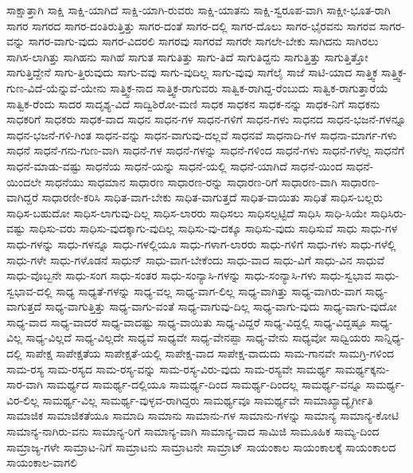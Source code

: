 {ಸಾಕ್ಷಾತ್ತಾಗಿ
ಸಾಕ್ಷಿ
ಸಾಕ್ಷಿ-ಯಾಗಿದೆ
ಸಾಕ್ಷಿ-ಯಾಗಿ-ರುವರು
ಸಾಕ್ಷಿ-ಯಾತನು
ಸಾಕ್ಷಿ-ಸ್ವರೂಪ-ವಾಗಿ
ಸಾಕ್ಷೀ-ಭೂತ-ರಾಗಿ
ಸಾಗರ
ಸಾಗರದ
ಸಾಗರ-ದಂತಿರುತ್ತಿತ್ತು
ಸಾಗರ-ದಂತೆ
ಸಾಗರ-ದಲ್ಲಿ
ಸಾಗರ-ದೊಲು
ಸಾಗರ-ಭೈರವನು
ಸಾಗರವ
ಸಾಗರ-ವನ್ನು
ಸಾಗರ-ವಾಗು-ವುದು
ಸಾಗರ-ವಿದರಲಿ
ಸಾಗರವು
ಸಾಗರವೆ
ಸಾಗರೇ
ಸಾಗಲೇ-ಬೇಕು
ಸಾಗಿದನು
ಸಾಗಿರಲು
ಸಾಗಿಸ-ಲಾಗಿತ್ತು
ಸಾಗಿಹನು
ಸಾಗಿಹೆ
ಸಾಗುತ
ಸಾಗುತಿತ್ತು
ಸಾಗು-ತಿದೆ
ಸಾಗುತಿದ್ದನು
ಸಾಗುತ್ತಿತ್ತು
ಸಾಗುತ್ತಿತ್ತೋ
ಸಾಗುತ್ತಿದ್ದೇನೆ
ಸಾಗು-ತ್ತಿರುವುದು
ಸಾಗು-ವವು
ಸಾಗು-ವುದಿಲ್ಲ
ಸಾಗು-ವುವು
ಸಾಗೆಲೈ
ಸಾಜೆ
ಸಾಟಿ-ಯಾದ
ಸಾತ್ತ್ವಿಕ
ಸಾತ್ತ್ವಿಕ-ಗುಣ-ವಿದೆ-ಯೆನ್ನುವೆ-ಯೇನು
ಸಾತ್ತ್ವಿಕ-ನಾದ
ಸಾತ್ತ್ವಿಕ-ರಾಗುವರು
ಸಾತ್ವಿಕ-ರಾಗಿದ್ದ-ರೆಂಬುದು
ಸಾತ್ವಿಕ-ರಾಗುತ್ತಾರೆಯೆ
ಸಾತ್ವಿಕ-ರೆಂದು
ಸಾದರ
ಸಾದೃಶ್ಯ-ವಿದೆ
ಸಾದ್ವಿಶಿರೋ-ಮಣಿ
ಸಾಧಕ
ಸಾಧಕನ
ಸಾಧಕ-ನನ್ನು
ಸಾಧಕ-ನಿಗೆ
ಸಾಧಕನು
ಸಾಧಕರಿಗೆ
ಸಾಧಕರು
ಸಾಧಕ-ವಾದ
ಸಾಧನ
ಸಾಧನ-ಗಳ
ಸಾಧನ-ಗಳಿಗೆ
ಸಾಧನ-ಗಳು
ಸಾಧನದ
ಸಾಧನ-ಭಜನೆ-ಗಳನ್ನೂ
ಸಾಧನ-ಭಜನೆ-ಗಳಿ-ಗಿಂತ
ಸಾಧನ-ವನ್ನು
ಸಾಧನ-ವಾಗುವು-ದಲ್ಲವೆ
ಸಾಧನವೆ
ಸಾಧನಾದಿ-ಗಳ
ಸಾಧನಾ-ಮಾರ್ಗ-ಗಳು
ಸಾಧನೆ
ಸಾಧನೆ-ಗನು-ಗುಣ-ವಾಗಿ
ಸಾಧನೆ-ಗಳ
ಸಾಧನೆ-ಗಳನ್ನು
ಸಾಧನೆ-ಗಳಿಂದ
ಸಾಧನೆ-ಗಳು
ಸಾಧನೆ-ಗಳೆಲ್ಲ
ಸಾಧನೆಗೆ
ಸಾಧನೆ-ಮಾಡು-ವಷ್ಟು
ಸಾಧನೆಯ
ಸಾಧನೆ-ಯನ್ನು
ಸಾಧನೆ-ಯಲ್ಲಿ
ಸಾಧನೆ-ಯಾಗಿದೆ
ಸಾಧನೆ-ಯಿಂದ
ಸಾಧನೆ-ಯಿಂದಲೇ
ಸಾಧನೆಯು
ಸಾಧಮಾನ
ಸಾಧಾರಣ
ಸಾಧಾರಣ-ರನ್ನು
ಸಾಧಾರಣ-ರಿಗೆ
ಸಾಧಾರಣ-ವಾಗಿ
ಸಾಧಾರಣ-ವಾಗಿದ್ದರೆ
ಸಾಧಾರಣೀ-ಕರಿಸಿ
ಸಾಧಿತ-ವಾಗ-ಬೇಕು
ಸಾಧಿತ-ವಾಗುತ್ತದೆ
ಸಾಧಿತ-ವಾಯಿತು
ಸಾಧಿತೆ
ಸಾಧಿಸ-ಬಲ್ಲರು
ಸಾಧಿಸ-ಬಹುದೋ
ಸಾಧಿಸ-ಲಾಗುವು-ದಿಲ್ಲ
ಸಾಧಿಸ-ಲಾರರು
ಸಾಧಿಸಲು
ಸಾಧಿಸಲ್ಪಟ್ಟಿದೆ
ಸಾಧಿಸಿ
ಸಾಧಿ-ಸಿಯೇ
ಸಾಧಿಸಿರು-ವಷ್ಟು
ಸಾಧಿಸು-ವರು
ಸಾಧಿಸು-ವುದಕ್ಕಾಗು-ವುದಿಲ್ಲ
ಸಾಧಿಸು-ವು-ದಕ್ಕೂ
ಸಾಧಿಸು-ವುದು
ಸಾಧಿಸುವೆ
ಸಾಧು
ಸಾಧು-ಗಳ
ಸಾಧು-ಗಳನ್ನು
ಸಾಧು-ಗಳನ್ನೂ
ಸಾಧು-ಗಳಲ್ಲಿಯೂ
ಸಾಧು-ಗಳಾಗ-ಲಾರರು
ಸಾಧು-ಗಳಿಗೆ
ಸಾಧು-ಗಳು
ಸಾಧು-ಗಳೆಲ್ಲಿ
ಸಾಧು-ಗಳೇ
ಸಾಧು-ಗಳೊಡನೆ
ಸಾಧುನ್
ಸಾಧು-ವಾಗ-ಬೇಕೆಂದು
ಸಾಧು-ವಾದ
ಸಾಧು-ವಿಗೆ
ಸಾಧು-ವಿನ
ಸಾಧುವೆ
ಸಾಧು-ವೊಬ್ಬನೇ
ಸಾಧು-ಸಂಗ
ಸಾಧು-ಸಂತರ
ಸಾಧು-ಸಂನ್ಯಾಸಿ-ಗಳನ್ನು
ಸಾಧು-ಸಂನ್ಯಾಸಿ-ಗಳು
ಸಾಧು-ಸ್ವಭಾವ
ಸಾಧು-ಸ್ವಭಾವ-ದಲ್ಲಿ
ಸಾಧ್ಯ
ಸಾಧ್ಯತೆ-ಗಳನ್ನು
ಸಾಧ್ಯ-ವಲ್ಲ
ಸಾಧ್ಯ-ವಾಗ-ಲಿಲ್ಲ
ಸಾಧ್ಯ-ವಾಗಿತ್ತು
ಸಾಧ್ಯ-ವಾಗಿರು-ವಾಗ
ಸಾಧ್ಯ-ವಾಗುತ್ತದೆ
ಸಾಧ್ಯ-ವಾಗುತ್ತಿತ್ತು
ಸಾಧ್ಯ-ವಾಗು-ವಂತೆ
ಸಾಧ್ಯ-ವಾಗುವು-ದಿಲ್ಲ
ಸಾಧ್ಯ-ವಾಗು-ವುದು
ಸಾಧ್ಯ-ವಾಗು-ವುದೋ
ಸಾಧ್ಯ-ವಾದ
ಸಾಧ್ಯ-ವಾದರೆ
ಸಾಧ್ಯ-ವಾದಷ್ಟು
ಸಾಧ್ಯ-ವಾಯಿತು
ಸಾಧ್ಯ-ವಿದ್ದರೆ
ಸಾಧ್ಯ-ವಿದ್ದಲ್ಲಿ
ಸಾಧ್ಯ-ವಿದ್ದಷ್ಟೂ
ಸಾಧ್ಯ-ವಿಲ್ಲ
ಸಾಧ್ಯ-ವಿಲ್ಲದೆ
ಸಾಧ್ಯ-ವಿಲ್ಲದೇ
ಸಾಧ್ಯವೆ
ಸಾಧ್ಯವೇ
ಸಾಧ್ಯ-ವೇನಪ್ಪಾ
ಸಾಧ್ಯ-ವೇನು
ಸಾಧ್ಯವೋ
ಸಾಧ್ವಿಯರು
ಸಾನ್ನಿಧ್ಯ-ದಲ್ಲಿ
ಸಾಪೇಕ್ಷ
ಸಾಪೇಕ್ಷತೆಯ
ಸಾಪೇಕ್ಷತೆ-ಯಲ್ಲಿ
ಸಾಪೇಕ್ಷ-ವಾದ
ಸಾಪೇಕ್ಷ-ವಾದುದು
ಸಾಮ-ಗಾನವೇ
ಸಾಮಗ್ರಿ-ಗಳಿಂದ
ಸಾಮ-ರಸ್ಯ
ಸಾಮ-ರಸ್ಯದ
ಸಾಮ-ರಸ್ಯ-ವನ್ನು
ಸಾಮ-ರಸ್ಯ-ವಿರು-ವುದು
ಸಾಮ-ರಸ್ಯವೇ
ಸಾಮರ್ಥ್ಯ
ಸಾಮರ್ಥ್ಯಕ್ಕನು-ಸಾರ-ವಾಗಿ
ಸಾಮರ್ಥ್ಯದ
ಸಾಮರ್ಥ್ಯ-ದಲ್ಲಿಯೂ
ಸಾಮರ್ಥ್ಯ-ದಿಂದ
ಸಾಮರ್ಥ್ಯ-ದಿಂದಲ್ಲ
ಸಾಮರ್ಥ್ಯ-ವನ್ನೂ
ಸಾಮರ್ಥ್ಯ-ವಿರ-ಲಿಲ್ಲ
ಸಾಮರ್ಥ್ಯ-ವಿಲ್ಲ
ಸಾಮರ್ಥ್ಯ-ವುಳ್ಳವ-ರಾಗಿದ್ದರು
ಸಾಮರ್ಥ್ಯವೂ
ಸಾಮರ್ಥ್ಯವೇ
ಸಾಮಾಖ್ಯಾದ್ಯೈರ್ಗೀತಿ
ಸಾಮಾಜಿಕ
ಸಾಮಾಜಿಕತೆಯೂ
ಸಾಮಾದಿ
ಸಾಮಾನು
ಸಾಮಾನು-ಗಳ
ಸಾಮಾನು-ಗಳನ್ನು
ಸಾಮಾನ್ಯ
ಸಾಮಾನ್ಯ-ಕೋಟಿ
ಸಾಮಾನ್ಯ-ನಾಗಿರು-ವನು
ಸಾಮಾನ್ಯ-ರಿಗೆ
ಸಾಮಾನ್ಯ-ವಾಗಿ
ಸಾಮಾನ್ಯ-ವಾದ
ಸಾಮಿಜಿ
ಸಾಮೂಹಿಕ
ಸಾಮ್ಯ-ದಿಂದ
ಸಾಮ್ರಾಜ್ಯ-ಗಳೇ
ಸಾಮ್ರಾಟ-ನಿಗೆ
ಸಾಮ್ರಾಟನು
ಸಾಮ್ರಾಟನೇ
ಸಾಮ್ರಾಟ್
ಸಾಯಂಕಾಲ
ಸಾಯಂಕಾಲಕ್ಕೆ
ಸಾಯಂಕಾಲದ
ಸಾಯಂಕಾಲ-ವಾಗಲಿ
}
